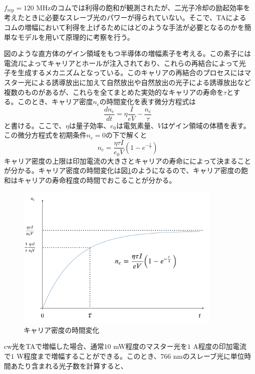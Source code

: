 \documentclass[uplatex, dvipdfmx, a4paper, report, papersize, 11pt]{jsbook}
\begin{document}
$f_{\mathrm{rep}} = 120$ MHzのコムでは利得の飽和が観測されたが、二光子冷却の励起効率を考えたときに必要なスレーブ光のパワーが得られていない。そこで、TAによるコムの増幅において利得を上げるためにはどのような手法が必要となるのかを簡単なモデルを用いて原理的に考察を行う。\par
図のような直方体のゲイン領域をもつ半導体の増幅素子を考える。この素子には電流$I$によってキャリアとホールが注入されており、これらの再結合によって光子を生成するメカニズムとなっている。このキャリアの再結合のプロセスにはマスター光による誘導放出に加えて自然放出や自然放出の光子による誘導放出など複数のものがあるが、これらを全てまとめた実効的なキャリアの寿命を$\tau$とする。このとき、キャリア密度$n_{\mathrm{c}}$の時間変化を表す微分方程式は
\begin{equation}
  \frac{dn_{\mathrm{c}}}{dt} = \eta \frac{I}{eV}-\frac{n_{\mathrm{c}}}{\tau}
\end{equation}
と書ける。ここで、$\eta$は量子効率、$e_0$は電気素量、$V$はゲイン領域の体積を表す。この微分方程式を初期条件$n_c = 0$の下で解くと
\begin{equation}
  n_c = \frac{\eta\tau I}{e_0V}\left(1-e^{-\frac{t}{\tau}}\right)
\end{equation}
キャリア密度の上限は印加電流の大きさとキャリアの寿命にによって決まることが分かる。キャリア密度の時間変化は図\ref{carrier_saturation}のようになるので、キャリア密度の飽和はキャリアの寿命程度の時間でおこることが分かる。\\
\begin{figure}[H]
 \begin{center}
  \includegraphics[width=100mm]{figures/chapter4/carrier_saturation.png}
\end{center}
 \caption{キャリア密度の時間変化}
 \label{carrier_saturation}
\end{figure}
cw光をTAで増幅した場合、通常$10$ mW程度のマスター光を$1$ A程度の印加電流で$1$ W程度まで増幅することができる。このとき、$766$ nmのスレーブ光に単位時間あたり含まれる光子数を計算すると、
\end{document}
